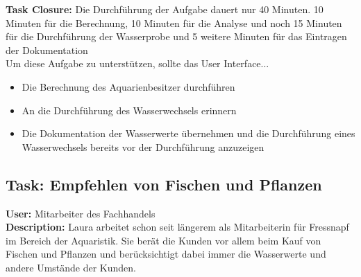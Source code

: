 \textbf{Task Closure:} Die Durchführung der Aufgabe dauert nur 40 Minuten. 10 Minuten für die Berechnung, 10 Minuten für die Analyse und noch 15 Minuten für die Durchführung der Wasserprobe und 5 weitere Minuten für das Eintragen der Dokumentation\\

Um diese Aufgabe zu unterstützen, sollte das User Interface...
\begin{itemize}
  \item Die Berechnung des Aquarienbesitzer durchführen
  \item An die Durchführung des Wasserwechsels erinnern
  \item Die Dokumentation der Wasserwerte übernehmen und die Durchführung eines Wasserwechsels bereits vor der Durchführung anzuzeigen
\end{itemize}


\subsection{Task: Empfehlen von Fischen und Pflanzen}
\textbf{User:} Mitarbeiter des Fachhandels\\

\textbf{Description:} Laura arbeitet schon seit längerem als Mitarbeiterin für Fressnapf im Bereich der Aquaristik. Sie berät die Kunden vor allem beim Kauf von Fischen und Pflanzen und berücksichtigt dabei immer die Wasserwerte und andere Umstände der Kunden.\\

